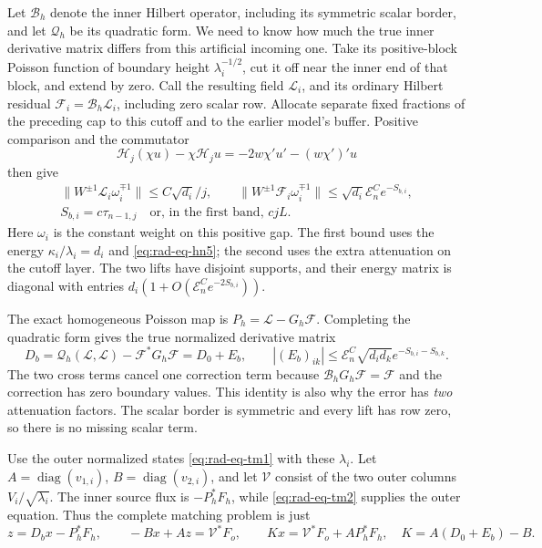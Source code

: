 Let $\mathcal B_h$ denote the inner Hilbert operator, including its
symmetric scalar border, and let $\mathcal Q_h$ be its quadratic form.
We need to know how much the true inner derivative matrix differs
from this artificial incoming one.  Take its positive-block Poisson
function of boundary height $\lambda_i^{-1/2}$, cut it off near the
inner end of that block, and extend by zero.  Call the resulting field
$\mathcal L_i$, and its ordinary Hilbert residual
$\mathcal F_i=\mathcal B_h\mathcal L_i$, including zero scalar row.
Allocate separate fixed fractions of the preceding cap to this cutoff
and to the earlier model's buffer.  Positive comparison and the
commutator
\[
 \mathscr H_j(\chi u)-\chi\mathscr H_ju
       =-2w\chi'u'-(w\chi')'u
\]
then give
\begin{equation}\label{eq:rad-eq-tm6}
 \begin{gathered}
 \|W^{\pm1}\mathcal L_i\omega_i^{\mp1}\|
       \le C\sqrt{d_i}/j,\qquad
 \|W^{\pm1}\mathcal F_i\omega_i^{\mp1}\|
       \le\sqrt{d_i}\mathcal E_n^Ce^{-S_{b,i}},\\
 S_{b,i}=c\tau_{n-1,j}\quad\text{or, in the first band, }cjL.
 \end{gathered}
\end{equation}
Here $\omega_i$ is the constant weight on this positive gap.
The first bound uses the energy $\kappa_i/\lambda_i=d_i$ and
\eqref{eq:rad-eq-hn5}; the second uses the extra attenuation on the
cutoff layer.  The two lifts have disjoint supports, and their energy
matrix is diagonal with entries
$d_i(1+O(\mathcal E_n^Ce^{-2S_{b,i}}))$.

The exact homogeneous Poisson map is
$P_h=\mathcal L-G_h\mathcal F$.
Completing the quadratic form gives the true normalized derivative
matrix
\begin{equation}\label{eq:rad-eq-tm7}
 D_b=\mathcal Q_h(\mathcal L,\mathcal L)-\mathcal F^*G_h\mathcal F
       =D_0+E_b,
 \qquad |(E_b)_{ik}|\le
     \mathcal E_n^C\sqrt{d_id_k}e^{-S_{b,i}-S_{b,k}}.
\end{equation}
The two cross terms cancel one correction term because
$\mathcal B_hG_h\mathcal F=\mathcal F$ and the correction has zero
boundary values.  This identity is also why the error has \emph{two}
attenuation factors.  The scalar border is symmetric and every lift
has row zero, so there is no missing scalar term.

Use the outer normalized states \eqref{eq:rad-eq-tm1} with these
$\lambda_i$.  Let $A=\operatorname{diag}(v_{1,i})$,
$B=\operatorname{diag}(v_{2,i})$, and let $\mathcal V$ consist of
the two outer columns $V_i/\sqrt{\lambda_i}$.
The inner source flux is $-P_h^*F_h$, while
\eqref{eq:rad-eq-tm2} supplies the outer equation.  Thus the complete
matching problem is just
\begin{equation}\label{eq:rad-eq-tm8}
 z=D_bx-P_h^*F_h,\qquad -Bx+Az=\mathcal V^*F_o,\qquad
 Kx=\mathcal V^*F_o+AP_h^*F_h,\quad K=A(D_0+E_b)-B.
\end{equation}

